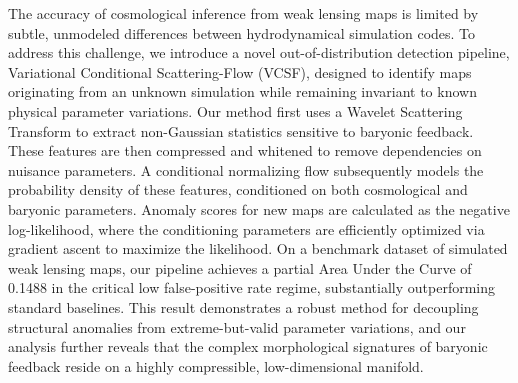 \documentclass[]{article}
\begin{document}
The accuracy of cosmological inference from weak lensing maps is limited by subtle, unmodeled differences between hydrodynamical simulation codes. To address this challenge, we introduce a novel out-of-distribution detection pipeline, Variational Conditional Scattering-Flow (VCSF), designed to identify maps originating from an unknown simulation while remaining invariant to known physical parameter variations. Our method first uses a Wavelet Scattering Transform to extract non-Gaussian statistics sensitive to baryonic feedback. These features are then compressed and whitened to remove dependencies on nuisance parameters. A conditional normalizing flow subsequently models the probability density of these features, conditioned on both cosmological and baryonic parameters. Anomaly scores for new maps are calculated as the negative log-likelihood, where the conditioning parameters are efficiently optimized via gradient ascent to maximize the likelihood. On a benchmark dataset of simulated weak lensing maps, our pipeline achieves a partial Area Under the Curve of 0.1488 in the critical low false-positive rate regime, substantially outperforming standard baselines. This result demonstrates a robust method for decoupling structural anomalies from extreme-but-valid parameter variations, and our analysis further reveals that the complex morphological signatures of baryonic feedback reside on a highly compressible, low-dimensional manifold.
\end{document}
